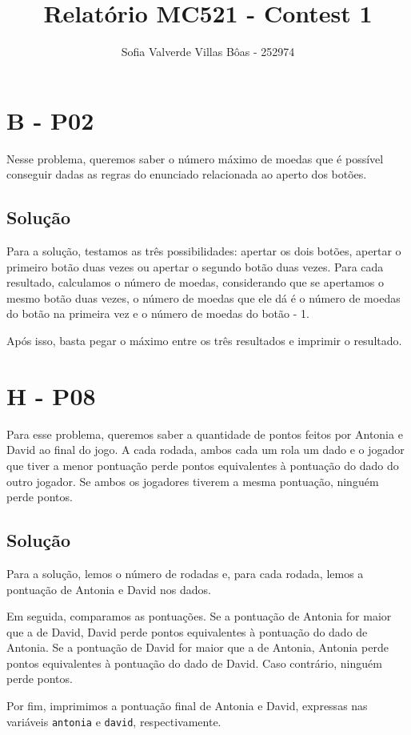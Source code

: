 \documentclass[12pt,a4paper]{article}
\title{Relatório MC521 - Contest 1}
\author{Sofia Valverde Villas Bôas - 252974}
\begin{document}
\maketitle

\section*{B - P02}

Nesse problema, queremos saber o número máximo de moedas
que é possível conseguir dadas as regras do enunciado relacionada
ao aperto dos botões. 

\subsection*{Solução}

Para a solução, testamos as três possibilidades: apertar os dois botões,
apertar o primeiro botão duas vezes ou apertar o segundo botão duas vezes.
Para cada resultado, calculamos o número de moedas, considerando
que se apertamos o mesmo botão duas vezes, o número de moedas que
ele dá é o número de moedas do botão na primeira vez e o número de moedas
do botão - 1.

Após isso, basta pegar o máximo entre os três resultados e imprimir o resultado.

\section*{H - P08}

Para esse problema, queremos saber a quantidade de pontos feitos por 
Antonia e David ao final do jogo. A cada rodada, ambos cada um rola um dado
e o jogador que tiver a menor pontuação perde pontos equivalentes à pontuação do dado do outro jogador.
Se ambos os jogadores tiverem a mesma pontuação, ninguém perde pontos.

\subsection*{Solução}

Para a solução, lemos o número de rodadas e, para cada rodada, lemos a pontuação de Antonia e David nos dados.

Em seguida, comparamos as pontuações. Se a pontuação de Antonia for maior que a de David, David perde pontos equivalentes à pontuação do dado de Antonia.
Se a pontuação de David for maior que a de Antonia, Antonia perde pontos equivalentes à pontuação do dado de David. 
Caso contrário, ninguém perde pontos.

Por fim, imprimimos a pontuação final de Antonia e David, expressas nas variáveis \texttt{antonia} e \texttt{david}, respectivamente.
\end{document}
